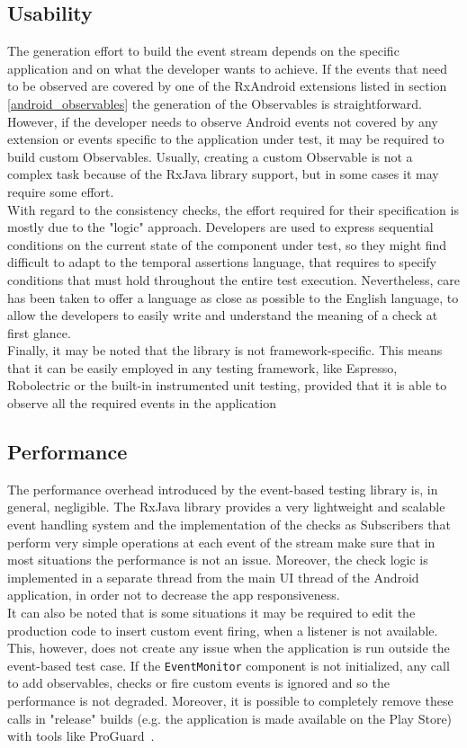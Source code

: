 \documentclass[11pt,a4paper,notitlepage]{article}
\newcommand{\fix}[1]{\fxnote{#1}\xspace}
\begin{document}
{\subsection{Usability}
The generation effort to build the event stream depends on the specific application and on what the developer wants to achieve. If the events that need to be observed are covered by one of the RxAndroid extensions listed in section \ref{android_observables} the generation of the Observables is straightforward. However, if the developer needs to observe Android events not covered by any extension or events specific to the application under test, it may be required to build custom Observables. Usually, creating a custom Observable is not a complex task because of the RxJava library support, but in some cases it may require some effort.\medskip \\
With regard to the consistency checks, the effort required for their specification is mostly due to the "logic" approach. Developers are used to express sequential conditions on the current state of the component under test, so they might find difficult to adapt to the temporal assertions language, that requires to specify conditions that must hold throughout the entire test execution. Nevertheless, care has been taken to offer a language as close as possible to the English language, to allow the developers to easily write and understand the meaning of a check at first glance.\medskip \\
Finally, it may be noted that the library is not framework-specific. This means that it can be easily employed in any testing framework, like Espresso, Robolectric or the built-in instrumented unit testing, provided that it is able to observe all the required events in the application

\subsection{Performance}
The performance overhead introduced by the event-based testing library is, in general, negligible. \fix{Did you measure it? Can you put an approximate number here?} The RxJava library provides a very lightweight and scalable event handling system and the implementation of the checks as Subscribers that perform very simple operations at each event of the stream make sure that in most situations the performance is not an issue. Moreover, the check logic is implemented in a separate thread from the main UI thread of the Android application, in order not to decrease the app responsiveness.\medskip \\
It can also be noted that is some situations it may be required to edit the production code to insert custom event firing, when a listener is not available. This, however, does not create any issue when the application is run outside the event-based test case. If the \texttt{EventMonitor} component is not initialized, any call to add observables, checks or fire custom events is ignored and so the performance is not degraded. Moreover, it is possible to completely remove these calls in "release" builds (e.g. the application is made available on the Play Store) with tools like ProGuard~\cite{ProGuard}.

}
\end{document}
